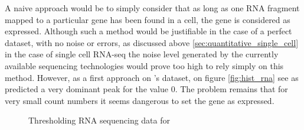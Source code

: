   A naive approach would be to simply consider that as long as one RNA fragment mapped to a particular gene has been found in a cell, the gene is considered as expressed. Although such a method would be justifiable in the case of a perfect dataset, with no noise or errors, as discussed above \ref{sec:quantitative_single_cell} in the case of single cell RNA-seq the noise level generated by the currently available sequencing technologies would prove too high to rely simply on this method. However, as a first approach on \platy{}'s dataset, on figure \ref{fig:hist_rna} see as predicted a very dominant peak for the value $0$. The problem remains that for very small count numbers it seems dangerous to set the gene as expressed.\\
  
\begin{figure}[h]
        \myfloatalign
         \quad
        \caption{Thresholding RNA sequencing data for \platy{}}\label{fig:platynereis_single_cell}
\end{figure}
  
